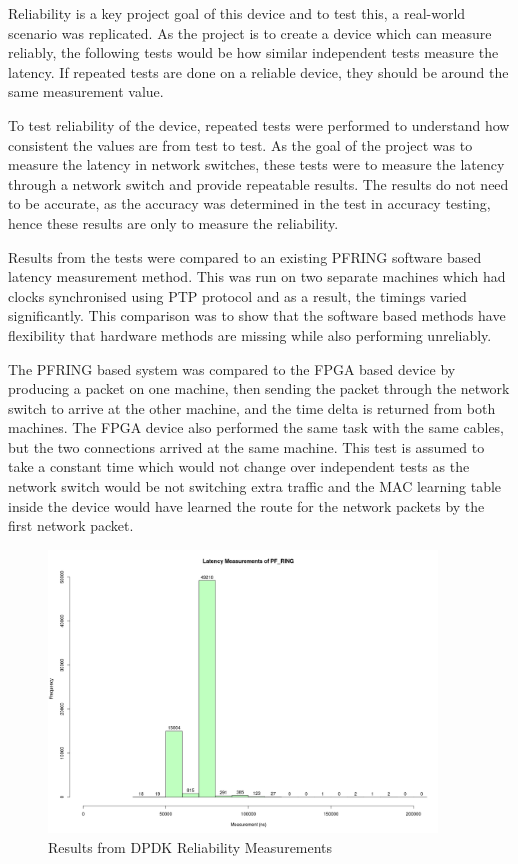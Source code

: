 Reliability is a key project goal of this device and to test this, a real-world scenario was replicated. As the 
project is to create a device which can measure reliably, the following tests would be how similar independent tests 
measure the latency. If repeated tests are done on a reliable device, they should be around the same measurement 
value.

To test reliability of the device, repeated tests were performed to understand how consistent the values are from 
test to test. As the goal of the project was to measure the latency in network switches, these tests were to measure 
the latency through a network switch and provide repeatable results. The results do not need to be accurate, as the 
accuracy was determined in the test in accuracy testing, hence these results are only to measure the reliability. 

Results from the tests were compared to an existing PF\textunderscore RING software based latency measurement method.
This was run on two separate machines which had clocks synchronised using PTP protocol and as a result, the timings 
varied significantly. This comparison was to show that the software based methods have flexibility that hardware 
methods are missing while also performing unreliably. 

The PF\textunderscore RING based system was compared to the FPGA based device by producing a packet on one machine, 
then sending the packet through the network switch to arrive at the other machine, and the time delta is returned 
from both machines. The FPGA device also performed the same task with the same cables, but the two connections 
arrived at the same machine. This test is assumed to take a constant time which would not change over independent 
tests as the network switch would be not switching extra traffic and the MAC learning table inside the device would 
have learned the route for the network packets by the first network packet. 

\begin{figure}[H]
    \begin{center}
        \includegraphics[keepaspectratio,height=7.5cm]{Images/pf_ring}
        \caption{Results from DPDK Reliability Measurements}
        \label{fig:DPDKReliability}
    \end{center}
\end{figure}

